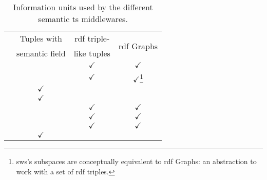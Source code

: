 
\begin{savenotes}
  \begin{table}[htbp]
    \caption{Information units used by the different semantic \ac{ts} middlewares.}
    \centering
    \begin{tabular}{ l c c c }
      \hline 
	& Tuples with & \ac{rdf} triple- & \multirow{2}{*}{\ac{rdf} Graphs} \\
	& semantic field & like tuples & \\
      \hline 
      \midtsc{} & & $\checkmark$ & $\checkmark$ \\ %
      \midsws{} & & $\checkmark$ & $\checkmark$\footnote{\ac{sws}'s subspaces are conceptually equivalent to \ac{rdf} Graphs: an abstraction to work with a set of \ac{rdf} triples.} \\
      \midstuples{} & $\checkmark$ & & \\
      \midcspaces{} & $\checkmark$ & & \\ %
      \midtscpp{} & & $\checkmark$ & $\checkmark$ \\
      \midtripcom{} & & $\checkmark$ & $\checkmark$ \\
      \midsmartmt{} & & $\checkmark$ & $\checkmark$ \\
      \midnardini{} & $\checkmark$ & & \\
      \hline 
    \end{tabular}
    \label{tab:tuple_comparison}
  \end{table}
\end{savenotes}